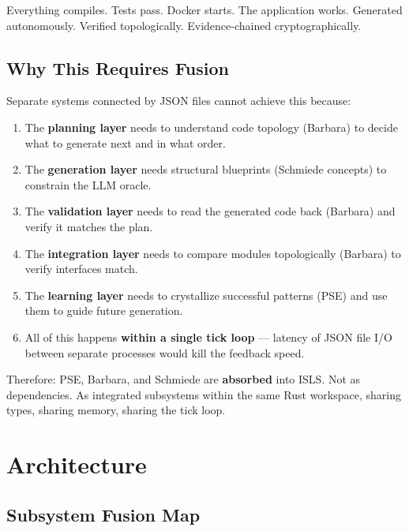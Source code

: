 \documentclass[11pt,a4paper]{article}
\begin{document}
Everything compiles. Tests pass. Docker starts. The application works.
Generated autonomously. Verified topologically. Evidence-chained
cryptographically.

\subsection{Why This Requires Fusion}

Separate systems connected by JSON files cannot achieve this because:

\begin{enumerate}
\item The \textbf{planning layer} needs to understand code topology
  (Barbara) to decide what to generate next and in what order.
\item The \textbf{generation layer} needs structural blueprints
  (Schmiede concepts) to constrain the LLM oracle.
\item The \textbf{validation layer} needs to read the generated code
  back (Barbara) and verify it matches the plan.
\item The \textbf{integration layer} needs to compare modules
  topologically (Barbara) to verify interfaces match.
\item The \textbf{learning layer} needs to crystallize successful
  patterns (PSE) and use them to guide future generation.
\item All of this happens \textbf{within a single tick loop} ---
  latency of JSON file I/O between separate processes would kill
  the feedback speed.
\end{enumerate}

Therefore: PSE, Barbara, and Schmiede are \textbf{absorbed} into
ISLS. Not as dependencies. As integrated subsystems within the
same Rust workspace, sharing types, sharing memory, sharing the
tick loop.

\section{Architecture}

\subsection{Subsystem Fusion Map}
\end{document}
